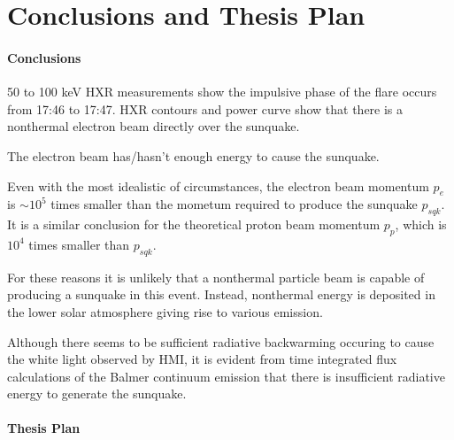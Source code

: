 \section{Conclusions and Thesis Plan}

\paragraph{Conclusions}
50 to 100 keV HXR measurements show the impulsive phase of the flare occurs from 17:46 to 17:47. HXR contours and power curve  show that there is a nonthermal electron beam directly over the sunquake. 

The electron beam has/hasn't enough energy to cause the sunquake.

Even with the most idealistic of circumstances, the electron beam momentum $p_e$ is $\sim 10^{5}$ times smaller than the mometum required to produce the sunquake $p_{sqk}$. It is a similar conclusion for the theoretical proton beam momentum $p_{p}$, which is $10^{4}$ times smaller than $p_{sqk}$.

For these reasons it is unlikely that a nonthermal particle beam is capable of producing a sunquake in this event. Instead, nonthermal energy is deposited in the lower solar atmosphere giving rise to various emission. 

Although there seems to be sufficient radiative backwarming occuring to cause the white light observed by HMI, it is evident from time integrated flux calculations of the Balmer continuum emission that there is insufficient radiative energy to generate the sunquake. 



\paragraph{Thesis Plan}


